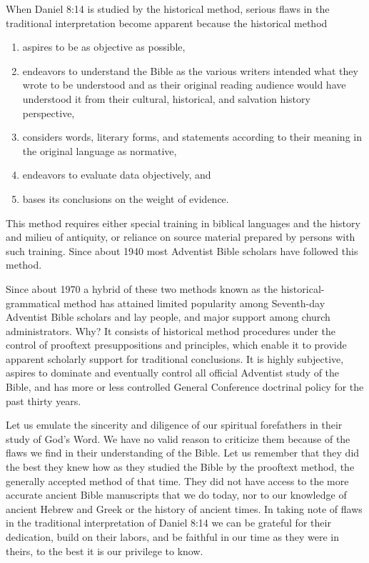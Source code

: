 When Daniel 8:14 is studied by the historical method, serious flaws in the
traditional interpretation become apparent because the historical method
\begin{enumerate}
    \item
aspires to be as objective as possible,
    \item endeavors to understand the
Bible as the various writers intended what they wrote to be understood and
as their original reading audience would have understood it from their
cultural, historical, and salvation history perspective,
    \item considers
words, literary forms, and statements according to their meaning in the
original language as normative,
    \item endeavors to evaluate data objectively,
and
    \item bases its conclusions on the weight of evidence.
\end{enumerate}
This method
requires either special training in biblical languages and the history and
milieu of antiquity, or reliance on source material prepared by persons with
such training. Since about 1940 most Adventist Bible scholars have followed
this method.

Since about 1970 a hybrid of these two methods known as the
historical-grammatical method\cite{71} has attained limited popularity among
Seventh-day Adventist Bible scholars and lay people, and major support among
church administrators. Why? It consists of historical method procedures
under the control of prooftext presuppositions and principles, which enable
it to provide apparent scholarly support for traditional conclusions. It is
highly subjective, aspires to dominate and eventually control all official
Adventist study of the Bible, and has more or less controlled General
Conference doctrinal policy for the past thirty years.

Let us emulate the sincerity and diligence of our spiritual forefathers in
their study of God's Word. We have no valid reason to criticize them because
of the flaws we find in their understanding of the Bible. Let us remember
that they did the best they knew how as they studied the Bible by the 
prooftext method, the generally accepted method of that time. They did not
have access to the more accurate ancient Bible manuscripts that we do today,
nor to our knowledge of ancient Hebrew and Greek or the history of ancient
times. In taking note of flaws in the traditional interpretation of Daniel
8:14 we can be grateful for their dedication, build on their labors, and be
faithful in our time as they were in theirs, to the best it is our privilege
to know.
